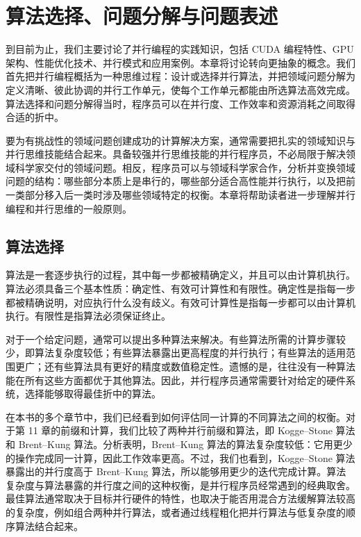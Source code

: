 \chapter{算法选择、问题分解与问题表述}
\label{chap:algorithm-selection-problem-decomposition}
\chaptercontents

到目前为止，我们主要讨论了并行编程的实践知识，包括 CUDA 编程特性、GPU 架构、性能优化技术、并行模式和应用案例。本章将讨论转向更抽象的概念。我们首先把并行编程概括为一种思维过程：设计或选择并行算法，并把领域问题分解为定义清晰、彼此协调的并行工作单元，使每个工作单元都能由所选算法高效完成。算法选择和问题分解得当时，程序员可以在并行度、工作效率和资源消耗之间取得合适的折中。

要为有挑战性的领域问题创建成功的计算解决方案，通常需要把扎实的领域知识与并行思维技能结合起来。具备较强并行思维技能的并行程序员，不必局限于解决领域科学家交付的领域问题。相反，程序员可以与领域科学家合作，分析并变换领域问题的结构：哪些部分本质上是串行的，哪些部分适合高性能并行执行，以及把前一类部分移入后一类时涉及哪些领域特定的权衡。本章将帮助读者进一步理解并行编程和并行思维的一般原则。

\section{算法选择}
\label{sec:algorithm-selection}

算法是一套逐步执行的过程，其中每一步都被精确定义，并且可以由计算机执行。算法必须具备三个基本性质：确定性、有效可计算性和有限性。确定性是指每一步都被精确说明，对应执行什么没有歧义。有效可计算性是指每一步都可以由计算机执行。有限性是指算法必须保证终止。

对于一个给定问题，通常可以提出多种算法来解决。有些算法所需的计算步骤较少，即算法复杂度较低；有些算法暴露出更高程度的并行执行；有些算法的适用范围更广；还有些算法具有更好的精度或数值稳定性。遗憾的是，往往没有一种算法能在所有这些方面都优于其他算法。因此，并行程序员通常需要针对给定的硬件系统，选择能够取得最佳折中的算法。

在本书的多个章节中，我们已经看到如何评估同一计算的不同算法之间的权衡。对于第 11 章的前缀和计算，我们比较了两种并行前缀和算法，即 Kogge--Stone 算法和 Brent--Kung 算法。分析表明，Brent--Kung 算法的算法复杂度较低：它用更少的操作完成同一计算，因此工作效率更高。不过，我们也看到，Kogge--Stone 算法暴露出的并行度高于 Brent--Kung 算法，所以能够用更少的迭代完成计算。算法复杂度与算法暴露的并行度之间的这种权衡，是并行程序员经常遇到的经典取舍。最佳算法通常取决于目标并行硬件的特性，也取决于能否用混合方法缓解算法较高的复杂度，例如组合两种并行算法，或者通过线程粗化把并行算法与低复杂度的顺序算法结合起来。

